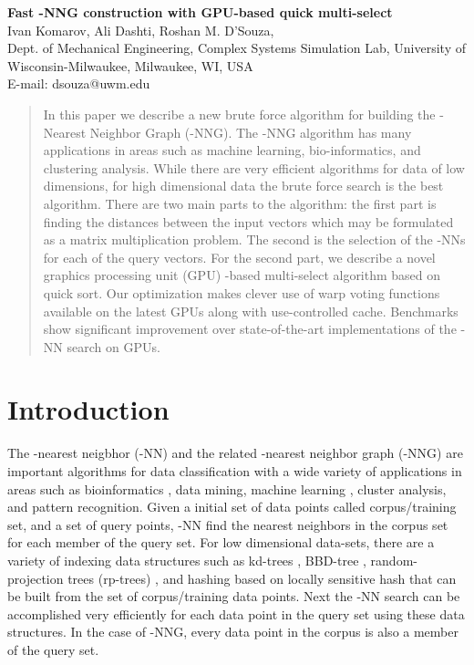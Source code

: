 \documentclass[10pt]{article}
\date{}
\begin{document}
\begin{flushleft}
{\Large
\textbf{Fast -NNG construction with GPU-based quick multi-select}
}
\\
Ivan Komarov, Ali Dashti,  
Roshan M. D'Souza, 
\\
 Dept. of Mechanical Engineering, Complex Systems Simulation Lab, University of Wisconsin-Milwaukee, Milwaukee, WI, USA
\\
 E-mail: dsouza@uwm.edu
\end{flushleft}
\begin{abstract}
In this paper we describe a new brute force algorithm for building the -Nearest Neighbor Graph (-NNG). The -NNG algorithm has many applications in areas such as machine learning, bio-informatics, and clustering analysis. While there are very efficient algorithms for data of low dimensions, for high dimensional data the brute force search is the best algorithm.  There are two main parts to the algorithm: the first part is finding the distances between the input vectors which may be formulated as a matrix multiplication problem. The second is the selection of the -NNs for each of the query vectors. For the second part, we describe a novel graphics processing unit (GPU) -based multi-select algorithm based on quick sort.  Our optimization makes clever use of warp voting functions available on the latest GPUs along with use-controlled cache. Benchmarks show significant improvement over state-of-the-art implementations of the -NN search on GPUs. 

\end{abstract}

\section{Introduction}
The -nearest neigbhor (-NN) and the related -nearest neighbor graph (-NNG) are important algorithms for data classification with a wide variety of applications in areas such as bioinformatics \cite{Roberts:2007, Weston:2004}, data mining\cite{Zaki:2000}, machine learning \cite{Maier:2009,Liu:2010,Tenenbaum:2000}, cluster analysis\cite{Franti:2006}, and pattern recognition\cite{Duda:2001}. Given a initial set of data points called corpus/training set, and a set of query points, -NN find the nearest  neighbors in the corpus set for each member of the query set. For low dimensional data-sets, there are a variety of indexing data structures such as  kd-trees \cite{Jones:2011}, BBD-tree \cite{Arya:1994}, random-projection trees (rp-trees) \cite{Dasgupta:2008}, and hashing based on locally sensitive hash \cite{Datar:2004} that can be built from the set of corpus/training data points. Next the -NN search can be accomplished very efficiently for each data point in the query set using these data structures.  In the case of -NNG, every data point in the corpus is also a member of the query set. \\
\end{document}
